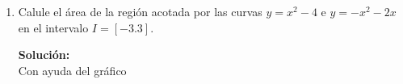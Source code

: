 \documentclass[12pt]{article}
\newenvironment{solucion}
{\begin{mdframed}[backgroundcolor=black!10]
		{\bf Solución:}\\
	}
	{
	\end{mdframed}
}
\newenvironment{preguntas}
{\begin{enumerate}\itemsep12pt
	}
	{
	\end{enumerate}
}
\newcommand{\ev}{\Big|}
\newcommand{\ra}{\rightarrow}
\begin{document}
\begin{preguntas}
\begin{solucion}
\begin{enumerate}[a)]
\item $\displaystyle\int_0^2 \dfrac{x^2}{x^3+8} dx$\\
			Usando la sustitución
			$$u=x^3+8 \ra du =  3x^2dx$$
			$$x \in (0, 2) \ra u \in (8, 16)$$
			$$\displaystyle\int_0^2 \dfrac{x^2}{x^3+8}dx = \dfrac{1}{3}\displaystyle\int_8^{16} \dfrac{du}{u} = \dfrac{1}{3}ln(u) \ev_8^{16} = \dfrac{1}{3}(ln(16)-ln(8)) = \dfrac{1}{3}ln\left(\dfrac{16}{8}\right) = \dfrac{1}{3}ln(2)$$
\item $\displaystyle\int_{-1}^1 xsen(1-x^2)dx$\\
			Usamos el cambio de variable
			$$u = 1-x^2 \ra du = -2xdx$$
			$$x \in (-1, 1) \ra u \in (0, 0)$$
			Como la variable $u$ va de 0 a 0, entonces la integral es igual a 0. Luego,
			$$\displaystyle\int_{-1}^1 xsen(1-x^2)dx = 0$$
\end{enumerate}
\end{solucion}
\item Calule el área de la región acotada por las curvas $y=x^2-4$ e $y = -x^2-2x$ en el intervalo $I =  [-3.3]$.
\begin{solucion}
Con ayuda del gráfico
		\begin{center}
\end{center}
\end{solucion}
\end{preguntas}
\end{document}
